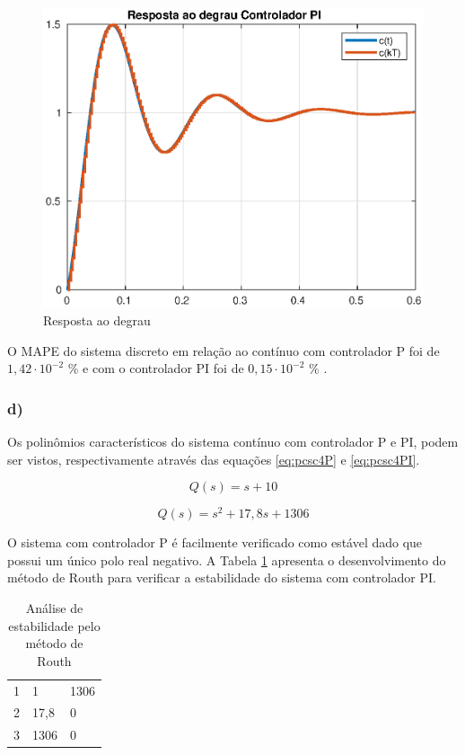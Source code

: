 \begin{figure}[!ht]
    \centering
    \includegraphics[width = 0.75\linewidth]{Figuras/ProblemasPI/Problema4/stepPIz.eps}
    \caption{Resposta ao degrau}
    \label{fig:Stepctds4PI}                   
\end{figure}

O MAPE do sistema discreto em relação ao contínuo com controlador P foi de $1,42 \cdot 10^{-2}$ \%  e
com o controlador PI foi de $ 0,15 \cdot 10^{-2}$ \% .

\clearpage 
\newpage
\subsubsection*{d)}


Os polinômios característicos do sistema contínuo com controlador P e PI, podem ser vistos, respectivamente
através das equações \ref{eq:pcsc4P} e \ref{eq:pcsc4PI}.

\begin{equation}
    Q(s) = s+10
    \label{eq:pcsc4P}
\end{equation}

\begin{equation}
    Q(s) = s^2 + 17,8 s + 1306
    \label{eq:pcsc4PI}
\end{equation}

O sistema com controlador P é facilmente verificado como
estável dado que possui um único polo real negativo. A Tabela \ref{tab:RE4} apresenta o desenvolvimento do método de
Routh para verificar a estabilidade do sistema com controlador PI. 

\begin{table}[!ht]
    \centering
    \vspace{0.5cm}
    \caption{Análise de estabilidade pelo método de Routh} 
    \begin{tabular}{r|ll}
        1 & 1 & 1306 \\
        2 & 17,8 & 0 \\
        3 & 1306 & 0 \\
    \end{tabular}                
    \label{tab:RE4}
\end{table}

